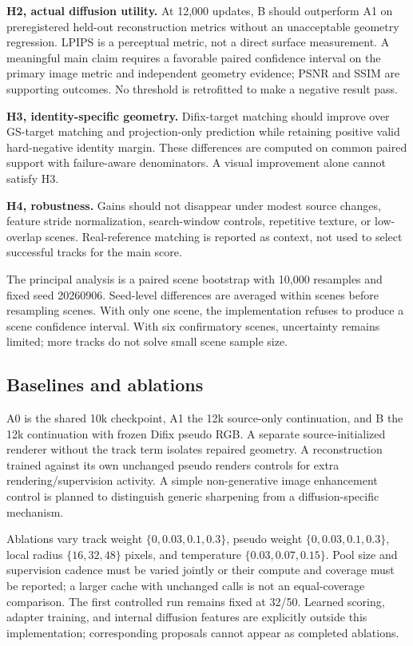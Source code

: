 \documentclass[10pt,twocolumn,letterpaper]{article}
\begin{document}
\textbf{H2, actual diffusion utility.} At 12,000 updates, B should outperform A1 on preregistered held-out reconstruction metrics without an unacceptable geometry regression. LPIPS is a perceptual metric, not a direct surface measurement. A meaningful main claim requires a favorable paired confidence interval on the primary image metric and independent geometry evidence; PSNR and SSIM are supporting outcomes. No threshold is retrofitted to make a negative result pass.

\textbf{H3, identity-specific geometry.} Difix-target matching should improve over GS-target matching and projection-only prediction while retaining positive valid hard-negative identity margin. These differences are computed on common paired support with failure-aware denominators. A visual improvement alone cannot satisfy H3.

\textbf{H4, robustness.} Gains should not disappear under modest source changes, feature stride normalization, search-window controls, repetitive texture, or low-overlap scenes. Real-reference matching is reported as context, not used to select successful tracks for the main score.

The principal analysis is a paired scene bootstrap with 10,000 resamples and fixed seed 20260906. Seed-level differences are averaged within scenes before resampling scenes. With only one scene, the implementation refuses to produce a scene confidence interval. With six confirmatory scenes, uncertainty remains limited; more tracks do not solve small scene sample size.

\subsection{Baselines and ablations}
A0 is the shared 10k checkpoint, A1 the 12k source-only continuation, and B the 12k continuation with frozen Difix pseudo RGB. A separate source-initialized renderer without the track term isolates repaired geometry. A reconstruction trained against its own unchanged pseudo renders controls for extra rendering/supervision activity. A simple non-generative image enhancement control is planned to distinguish generic sharpening from a diffusion-specific mechanism.

Ablations vary track weight $\{0,0.03,0.1,0.3\}$, pseudo weight $\{0,0.03,0.1,0.3\}$, local radius $\{16,32,48\}$ pixels, and temperature $\{0.03,0.07,0.15\}$. Pool size and supervision cadence must be varied jointly or their compute and coverage must be reported; a larger cache with unchanged calls is not an equal-coverage comparison. The first controlled run remains fixed at 32/50. Learned scoring, adapter training, and internal diffusion features are explicitly outside this implementation; corresponding proposals cannot appear as completed ablations.
\end{document}
